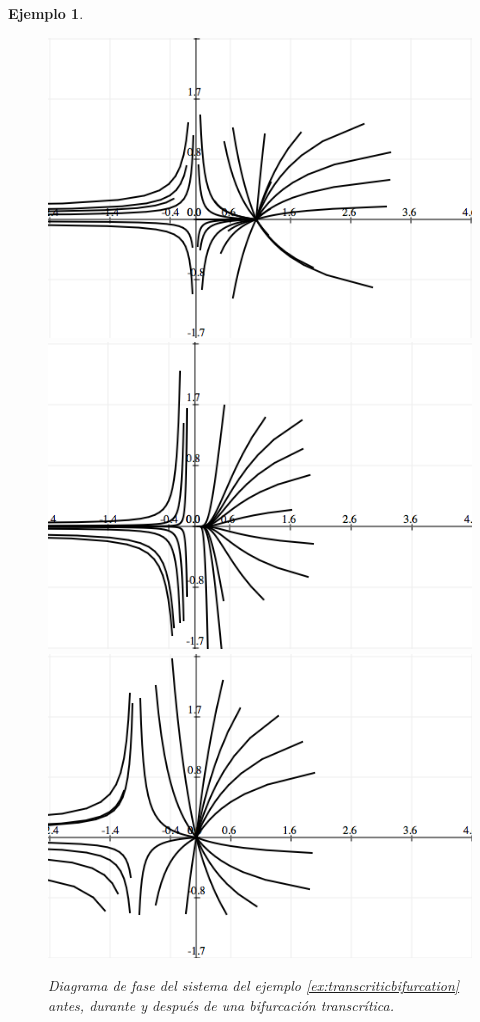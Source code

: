 \documentclass[11pt]{book}
\theoremstyle{definition}
\numberwithin{definition}{section}
\theoremstyle{theorem}
\numberwithin{theorem}{section}
\numberwithin{lemma}{section}
\numberwithin{corollary}{section}
\theoremstyle{plain}
\newtheorem{example}{Ejemplo}
\numberwithin{example}{section}
\begin{document}
\begin{example}
\begin{figure}[!ht] \centering
\includegraphics[scale=0.45]{figures/transcriticbifurcation-before.png}
\includegraphics[scale=0.45]{figures/transcriticbifurcation-during.png} \\
\includegraphics[scale=0.45]{figures/transcriticbifurcation-after.png}
\caption{Diagrama de fase del sistema del ejemplo \ref{ex:transcriticbifurcation} antes, durante y después de una bifurcación transcrítica.}
\end{figure}
\end{example}
\end{document}
